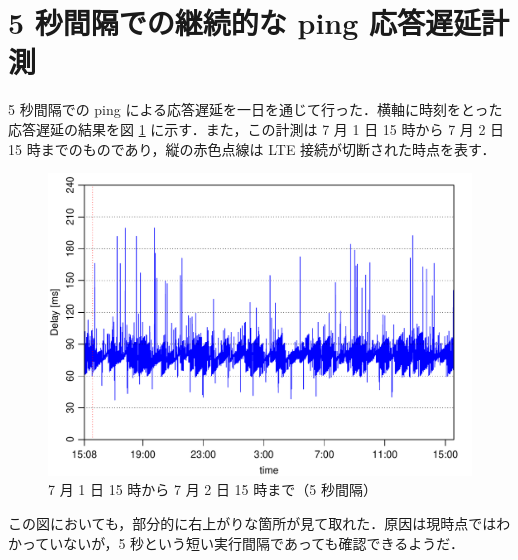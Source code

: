 \documentclass[a4j]{jarticle}
\begin{document}
\section{5 秒間隔での継続的な ping 応答遅延計測}
5 秒間隔での ping による応答遅延を一日を通じて行った．横軸に時刻をとった応答遅延の結果を図 \ref{data2} に示す．また，この計測は 7 月 1 日 15 時から 7 月 2 日 15 時までのものであり，縦の赤色点線は LTE 接続が切断された時点を表す．
\begin{figure}[tb]
\centering
\includegraphics[width=0.8\hsize]{plot5s.pdf}
\caption{ 7 月 1 日 15 時から 7 月 2 日 15 時まで（5 秒間隔）}
\label{data2}
\end{figure}
この図においても，部分的に右上がりな箇所が見て取れた．原因は現時点ではわかっていないが，5 秒という短い実行間隔であっても確認できるようだ．
\end{document}
